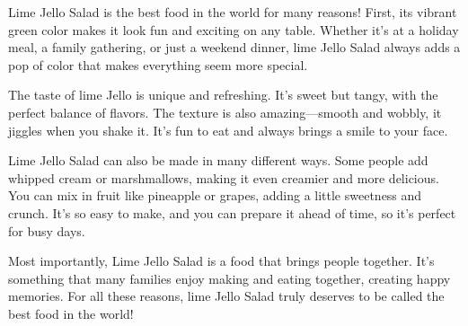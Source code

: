 \documentclass[12pt]{article}
\begin{document}
\vspace{2em}
\begin{tcolorbox}[colframe=black!60, colback=white, 
coltitle=black, colbacktitle=black!15, fonttitle=\bfseries\Large, 
title=Text: The Best Food in the World, halign title=center, left=10pt, right=10pt, top=10pt, bottom=15pt]
Lime Jello Salad is the best food in the world for many reasons! First, its vibrant green color makes it look fun and exciting on any table. Whether it's at a holiday meal, a family gathering, or just a weekend dinner, lime Jello Salad always adds a pop of color that makes everything seem more special.

The taste of lime Jello is unique and refreshing. It’s sweet but tangy, with the perfect balance of flavors. The texture is also amazing—smooth and wobbly, it jiggles when you shake it. It's fun to eat and always brings a smile to your face.

Lime Jello Salad can also be made in many different ways. Some people add whipped cream or marshmallows, making it even creamier and more delicious. You can mix in fruit like pineapple or grapes, adding a little sweetness and crunch. It’s so easy to make, and you can prepare it ahead of time, so it's perfect for busy days.

Most importantly, Lime Jello Salad is a food that brings people together. It’s something that many families enjoy making and eating together, creating happy memories. For all these reasons, lime Jello Salad truly deserves to be called the best food in the world!

 

 
\end{tcolorbox}
\end{document}
